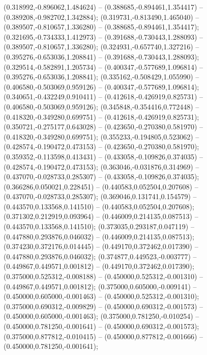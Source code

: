  (0.318992,-0.896062,1.484624) -- (0.388685,-0.894461,1.354417) -- (0.389208,-0.982702,1.342884);
 (0.319731,-0.813490,1.465040) -- (0.389507,-0.810657,1.336280) -- (0.388685,-0.894461,1.354417);
 (0.321695,-0.734333,1.412973) -- (0.391688,-0.730443,1.288093) -- (0.389507,-0.810657,1.336280);
 (0.324931,-0.657740,1.327216) -- (0.395276,-0.653036,1.208841) -- (0.391688,-0.730443,1.288093);
 (0.329514,-0.582891,1.205734) -- (0.400347,-0.577689,1.096814) -- (0.395276,-0.653036,1.208841);
 (0.335162,-0.508429,1.055990) -- (0.406580,-0.503069,0.959126) -- (0.400347,-0.577689,1.096814);
 (0.340651,-0.432249,0.910411) -- (0.412618,-0.426919,0.825731) -- (0.406580,-0.503069,0.959126);
 (0.345848,-0.354416,0.772448) -- (0.418320,-0.349280,0.699751) -- (0.412618,-0.426919,0.825731);
 (0.350721,-0.275177,0.643028) -- (0.423650,-0.270380,0.581970) -- (0.418320,-0.349280,0.699751);
 (0.355233,-0.194805,0.523062) -- (0.428574,-0.190472,0.473153) -- (0.423650,-0.270380,0.581970);
 (0.359352,-0.113598,0.413431) -- (0.433058,-0.109826,0.374035) -- (0.428574,-0.190472,0.473153);
 (0.363046,-0.031876,0.314969) -- (0.437070,-0.028733,0.285307) -- (0.433058,-0.109826,0.374035);
 (0.366286,0.050021,0.228451) -- (0.440583,0.052504,0.207608) -- (0.437070,-0.028733,0.285307);
 (0.369046,0.131741,0.154579) -- (0.443570,0.133568,0.141510) -- (0.440583,0.052504,0.207608);
 (0.371302,0.212919,0.093964) -- (0.446009,0.214135,0.087513) -- (0.443570,0.133568,0.141510);
 (0.373035,0.293187,0.047119) -- (0.447880,0.293876,0.046032) -- (0.446009,0.214135,0.087513);
 (0.374230,0.372176,0.014445) -- (0.449170,0.372462,0.017390) -- (0.447880,0.293876,0.046032);
 (0.374877,0.449523,-0.003777) -- (0.449867,0.449571,0.001812) -- (0.449170,0.372462,0.017390);
 (0.375000,0.525312,-0.008188) -- (0.450000,0.525312,-0.001310) -- (0.449867,0.449571,0.001812);
 (0.375000,0.605000,-0.009141) -- (0.450000,0.605000,-0.001463) -- (0.450000,0.525312,-0.001310);
 (0.375000,0.690312,-0.009829) -- (0.450000,0.690312,-0.001573) -- (0.450000,0.605000,-0.001463);
 (0.375000,0.781250,-0.010254) -- (0.450000,0.781250,-0.001641) -- (0.450000,0.690312,-0.001573);
 (0.375000,0.877812,-0.010415) -- (0.450000,0.877812,-0.001666) -- (0.450000,0.781250,-0.001641);
